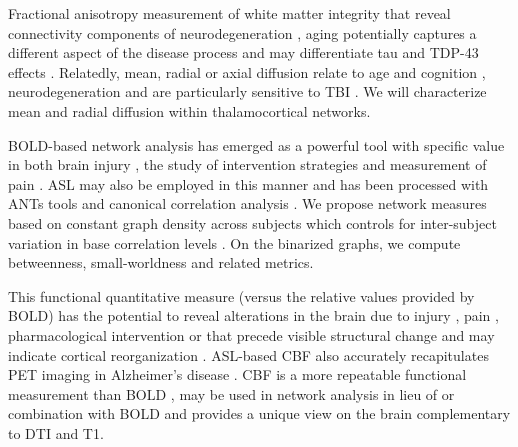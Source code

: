  Fractional anisotropy
measurement of white matter integrity that reveal connectivity
components of neurodegeneration \cite{Zhang2009}, aging
\cite{Kochunov2011} potentially captures a different aspect of the
disease process \cite{Englund2004} and may differentiate tau and
TDP-43 effects \cite{McMillan2013b}.  Relatedly, mean, radial or axial
diffusion relate to age and cognition
\cite{Wu2011,Pal2011,Bava2011,ODwyer2012,Bjoernebekk2012},
neurodegeneration \cite{Salami2012,Whitwell2010} and are particularly
sensitive to TBI \cite{Huang2009,Fox2013}.  We will characterize mean and radial diffusion
within thalamocortical networks.

 BOLD-based network analysis
\cite{Spoormaker2010,Sanz-Arigita2010} has emerged as a powerful tool
with specific value in both brain injury
\cite{Mayer2011,Scheibel2012,Zhou2013}, the study of intervention
strategies \cite{Roy2010,FeldsteinEwing2011} and measurement of pain
\cite{Mayhew2013}.  ASL may also be employed in this manner
\cite{Jann2013} and has been processed with ANTs tools and canonical
correlation analysis \cite{Duda2013}.  We propose network measures
based on constant graph density across subjects
which controls for inter-subject variation in base correlation levels
\cite{Liu2008, Power2011, Schwarz2011, Braun2012, Liang2012}. 
On the binarized graphs, we compute betweenness, small-worldness and
related metrics. 

  This functional
quantitative measure (versus the relative values provided by BOLD) has
the potential to reveal alterations in the brain due to injury
\cite{Kim2008}, pain \cite{Howard2011}, pharmacological intervention \cite{Black2010,Jenkins2012} or that precede visible structural change and may
indicate cortical reorganization \cite{Hayward2010}.  ASL-based CBF
also accurately recapitulates PET imaging in Alzheimer's disease \cite{Chen2011,Mak2012}.
CBF is a more repeatable functional measurement than BOLD
\cite{Liu2007,Aguirre2012}, may be used in network analysis in lieu of
or combination with 
BOLD \cite{Duda2013} and provides a unique view on the brain complementary to DTI and T1.  

